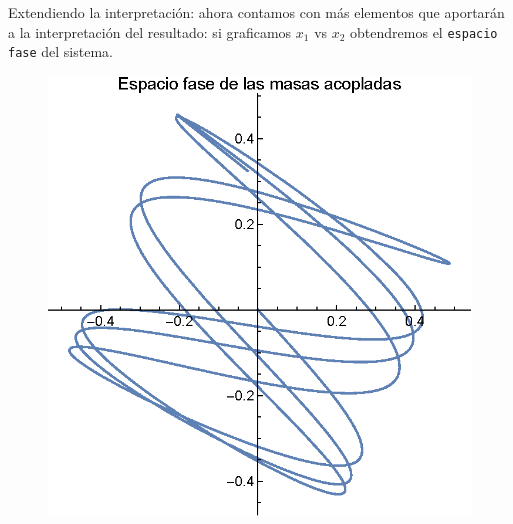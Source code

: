% 
% 
% 
% 
   
Extendiendo la interpretación: ahora contamos con más elementos que aportarán a la interpretación del resultado: si graficamos $x_{1}$ vs $x_{2}$ obtendremos el \texttt{espacio fase} del sistema.

% 

\begin{figure}[H]
    \centering
    \includegraphics[scale=1]{Imagenes/Ejercicio_masas_acopladas_03.eps}

\end{figure}


